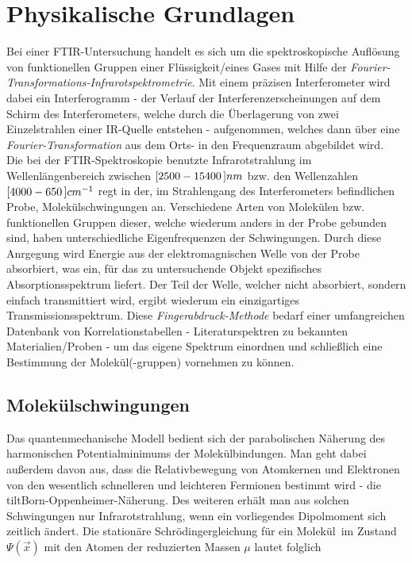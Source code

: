 \documentclass[a4paper,10pt,twocolumn]{article}
\newcommand{\tilt}[1]{\textit{#1}}
\begin{document}
	\section{Physikalische Grundlagen}

		Bei einer FTIR-Untersuchung handelt es sich um die spektroskopische Aufl\"osung von funktionellen Gruppen einer Fl\"ussigkeit/eines Gases mit Hilfe der \tilt{Fourier-Transformations-Infrarotspektrometrie}. Mit einem pr\"azisen Interferometer wird dabei ein Interferogramm - der Verlauf der Interferenzerscheinungen auf dem Schirm des Interferometers, welche durch die \"Uberlagerung von zwei Einzelstrahlen einer IR-Quelle entstehen - aufgenommen, welches dann \"uber eine \tilt{Fourier-Transformation} aus dem Orts- in den Frequenzraum abgebildet wird.\\
		Die bei der FTIR-Spektroskopie benutzte Infrarotstrahlung im Wellenl\"angenbereich zwischen $\unit[[2500-15400]]{nm}$ bzw. den Wellenzahlen $\unit[[4000-650]]{cm^{-1}}$ regt in der, im Strahlengang des Interferometers befindlichen Probe, Molek\"ulschwingungen an. Verschiedene Arten von Molek\"ulen bzw. funktionellen Gruppen dieser, welche wiederum anders in der Probe gebunden sind, haben unterschiedliche Eigenfrequenzen der Schwingungen. Durch diese Anrgegung wird Energie aus der elektromagnischen Welle von der Probe absorbiert, was ein, f\"ur das zu untersuchende Objekt spezifisches Absorptionsspektrum liefert. Der Teil der Welle, welcher nicht absorbiert, sondern einfach transmittiert wird, ergibt wiederum ein einzigartiges Transmissionsspektrum. Diese \tilt{Fingerabdruck-Methode} bedarf einer umfangreichen Datenbank von Korrelationstabellen - Literaturspektren zu bekannten Materialien/Proben - um das eigene Spektrum einordnen und schlie{\ss}lich eine Bestimmung der Molek\"ul(-gruppen) vornehmen zu k\"onnen.
		
	\subsection{Molek\"ulschwingungen}
	
		Das quantenmechanische Modell bedient sich der parabolischen N\"aherung des harmonischen Potentialminimums der Molek\"ulbindungen. Man geht dabei au{\ss}erdem davon aus, dass die Relativbewegung von Atomkernen und Elektronen von den wesentlich schnelleren und leichteren Fermionen bestimmt wird - die tilt{Born-Oppenheimer-N\"aherung}. Des weiteren erh\"alt man aus solchen Schwingungen nur Infrarotstrahlung, wenn ein vorliegendes Dipolmoment sich zeitlich \"andert. Die station\"are Schr\"odingergleichung f\"ur ein Molek\"ul\ im Zustand $\Psi(\vec{x})$ mit den Atomen der reduzierten Massen $\mu$	lautet folglich \cite{FTIRInfra}
		
\end{document}
